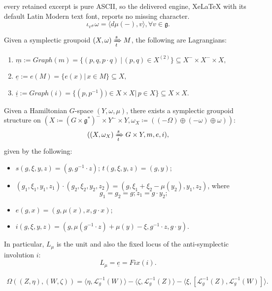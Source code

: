 \documentclass[10pt,a4paper]{amsart}
\begin{document}
every retained excerpt is pure ASCII, so the delivered engine, XeLaTeX with its default Latin Modern text font, reports no missing character.
\begin{equation}\label{hamilton}
  \iota_{v^\#}\omega = \langle d\mu(-), v \rangle, \forall v\in \mathfrak{g}.
\end{equation}

\begin{prop} \label{lagrangiansubmanifold}
Given a symplectic groupoid $(X, \omega) \xRightarrow[t]{s} M$, the following are Lagrangians:
\begin{enumerate}
\item $\underline{m} := Graph(m) = \{(p,q,p\cdot q) \ |\,  (p,q)\in X^{(2)}\} \subseteq X^- \times X^- \times X,$
\item $\underline{e} := e(M)=\{e(x) |\,  x\in M\} \subseteq X,$
\item $\underline{i} := Graph(i) =\{(p,p^{-1})) \in X \times X|\,  p\in X \}\subseteq X \times X.$ 
\end{enumerate}
\end{prop} 

\begin{theorem}\label{twisted-groupoid}
    Given a Hamiltonian $G$-space $(Y, \omega, \mu)$, there exists a symplectic groupoid structure on $(X \coloneqq (G \times \mathfrak{g}^*)^- \times Y^- \times Y, \omega_X \coloneqq ((-\Omega)\oplus (-\omega) \oplus \omega))$:
    $$((X , \omega_X) \xRightarrow[t]{s} G \times Y, m, e, i),$$
given by the following:
    \begin{itemize}
        \item  $s(g, \xi, y, z) = (g, g^{-1}\cdot z)$; $t(g, \xi, y, z) = (g, y)$;
        \item $(g_1, \xi_1, y_1, z_1) \cdot (g_2, \xi_2, y_2, z_2) = (g, \xi_1 + \xi_2 - \mu(y_2), y_1, z_2)$, where 
        $$g_1 = g_2 = g; z_1 = g\cdot y_2;$$
        \item $e(g, x) = (g, \mu(x), x, g\cdot x)$;
        \item $i(g, \xi, y, z) = (g, \mu(g^{-1}\cdot z)+ \mu(y) - \xi, g^{-1}\cdot z, g\cdot y)$.
    \end{itemize}

     In particular, $L_\mu$ is the unit and also the fixed locus of the anti-symplectic involution $i$:
    $$L_\mu = \underline{e} = Fix(i).$$
\end{theorem}

\begin{align}\label{symplecticform}
\Omega((Z, \eta), (W, \zeta)) = \langle \eta, \mathcal{L}^{-1}_{g}(W) \rangle - \langle \zeta, \mathcal{L}^{-1}_{g}(Z) \rangle - \langle \xi, [\mathcal{L}^{-1}_{g}(Z), \mathcal{L}^{-1}_{g}(W)] \rangle.
\end{align}
\end{document}
